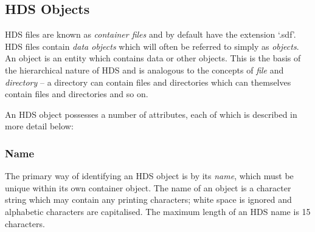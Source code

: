 \documentclass[final,authoryear,5p,times,twocolumn]{elsarticle}
\begin{document}
\subsection{\label{sect:objects}HDS Objects}

HDS files are known as \emph{container files} and by default have the
extension `.sdf'.  HDS files contain \emph{data objects} which will
often be referred to simply as \emph{objects}. An object is an entity
which contains data or other objects. This is the basis of the
hierarchical nature of HDS and is analogous to the concepts of
\emph{file} and \emph{directory} -- a directory can contain files and
directories which can themselves contain files and directories and so
on.

An HDS object possesses a number of attributes, each of which is
described in more detail below:

\subsubsection{\label{sect:name}Name}

The primary way of identifying an HDS object is by its \emph{name},
which must be unique within its own container object.  The name of an
object is a character string which may contain any printing
characters; white space is ignored and alphabetic characters are
capitalised. The maximum length of an HDS name is 15 characters.
\end{document}
